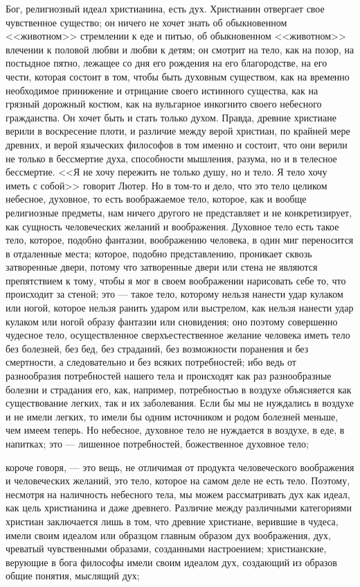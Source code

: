 \documentclass[12pt]{article}
\begin{document}
Бог, религиозный идеал христианина, есть дух. Христианин отвергает свое чувственное существо; он ничего не хочет знать об обыкновенном <<животном>> стремлении к еде и питью, об обыкновенном <<животном>> влечении к половой любви и любви к детям; он смотрит на тело, как на позор, на постыдное пятно, лежащее со дня его рождения на его благородстве, на его чести, которая состоит в том, чтобы быть духовным существом, как на временно необходимое принижение и отрицание своего истинного существа, как на грязный дорожный костюм, как на вульгарное инкогнито своего небесного гражданства. Он хочет быть и стать только духом. Правда, древние христиане верили в воскресение плоти, и различие между верой христиан, по крайней мере древних, и верой языческих философов в том именно и состоит, что они верили не только в бессмертие духа, способности мышления, разума, но и в телесное бессмертие. <<Я не хочу пережить не только душу, но и тело. Я тело хочу иметь с собой>>  говорит Лютер. Но в том-то и дело, что это тело целиком небесное, духовное, то есть воображаемое тело, которое, как и вообще религиозные предметы, нам ничего другого не представляет и не конкретизирует, как сущность человеческих желаний и воображения. Духовное тело есть такое тело, которое, подобно фантазии, воображению человека, в один миг переносится в отдаленные места; которое, подобно представлению, проникает сквозь затворенные двери, потому что затворенные двери или стена не являются препятствием к тому, чтобы я мог в своем воображении нарисовать себе то, что происходит за стеной; это --- такое тело, которому нельзя нанести удар кулаком или ногой, которое нельзя ранить ударом или выстрелом, как нельзя нанести удар кулаком или ногой образу фантазии или сновидения; оно поэтому совершенно чудесное тело, осуществленное сверхъестественное желание человека иметь тело без болезней, без бед, без страданий, без возможности поранения и без смертности, а следовательно и без всяких потребностей; ибо ведь от разнообразия потребностей нашего тела и происходят как раз разнообразные болезни и страдания его, как, например, потребностью в воздухе объясняется как существование легких, так и их заболевания. Если бы мы не нуждались в воздухе и не имели легких, то имели бы одним источником и родом болезней меньше, чем имеем теперь. Но небесное, духовное тело не нуждается в воздухе, в еде, в напитках; это --- лишенное потребностей, божественное духовное тело; 

короче говоря, --- это вещь, не отличимая от продукта человеческого воображения и человеческих желаний, это тело, которое на самом деле не есть тело. Поэтому, несмотря на наличность небесного тела, мы можем рассматривать дух как идеал, как цель христианина и даже древнего. Различие между различными категориями христиан заключается лишь в том, что древние христиане, верившие в чудеса, имели своим идеалом или образцом главным образом дух воображения, дух, чреватый чувственными образами, созданными настроением; христианские, верующие в бога философы имели своим идеалом дух, создающий из образов общие понятия, мыслящий дух; 
\end{document}
